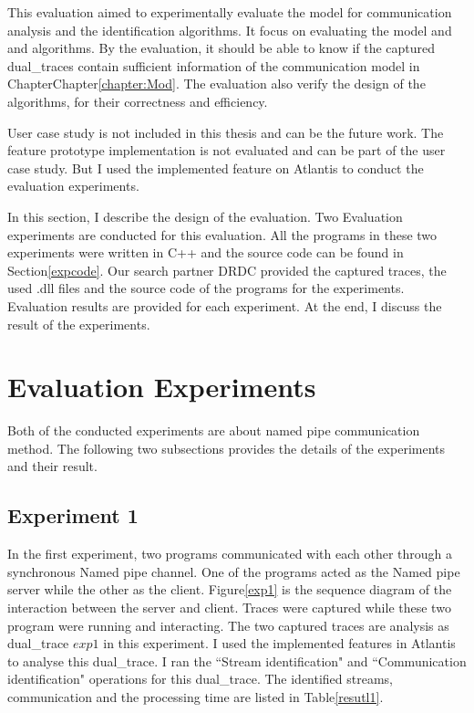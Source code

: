 


\label{chapter:Exp}
This evaluation aimed to experimentally evaluate the model for communication analysis and the identification algorithms. It focus on evaluating the model and and algorithms. By the evaluation, it should be able to know if the captured dual\_traces contain sufficient information of the communication model in ChapterChapter\ref{chapter:Mod}. The evaluation also verify the design of the algorithms, for their correctness and efficiency.  

User case study is not included in this thesis and can be the future work. The feature prototype implementation is not evaluated and can be part of the user case study. But I used the implemented feature on Atlantis to conduct the evaluation experiments.

In this section, I describe the design of the evaluation. Two Evaluation experiments are conducted for this evaluation.  All the programs in these two experiments were written in C++ and the source code can be found in Section\ref{expcode}. Our search partner DRDC provided the captured traces, the used .dll files and  the source code of the programs for the experiments. Evaluation results are provided for each experiment. At the end, I discuss the result of the experiments.  

\section{Evaluation Experiments}
Both of the conducted experiments are about named pipe communication method. The following two subsections provides the details of the experiments and their result.
\subsection{Experiment 1}
In the first experiment, two programs communicated with each other through a synchronous Named pipe channel. One of the programs acted as the Named pipe server while the other as the client. Figure\ref{exp1} is the sequence diagram of the interaction between the server and client. Traces were captured while these two program were running and interacting. The two captured traces are analysis as dual\_trace $exp1$ in this experiment. I used the implemented features in Atlantis to analyse this dual\_trace. I ran the ``Stream identification" and ``Communication identification" operations for this dual\_trace. The identified streams, communication and the processing time are listed in Table\ref{resutl1}.


